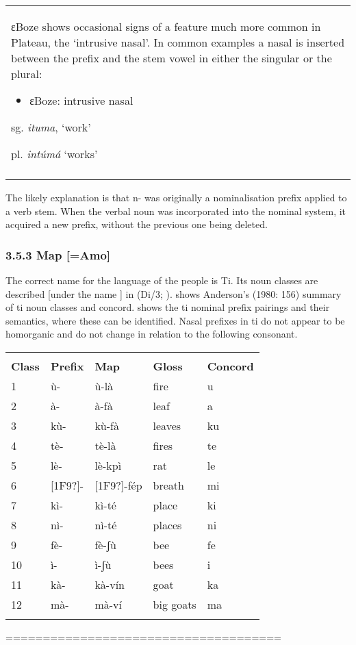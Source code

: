 \documentclass[output=paper]{langsci/langscibook}
\begin{document}
\begin{tabularx}{\textwidth}{X}
ɛBoze shows occasional signs of a feature much more common in Plateau, the ‘intrusive nasal’. In common examples a nasal is inserted between the prefix and the stem vowel in either the singular or the plural:

\begin{itemize}
\item ɛBoze: intrusive nasal\end{itemize}
    sg. \textit{ituma},  ‘work’

    pl. \textit{intúmá} ‘works’\\
\lspbottomrule
\end{tabularx}

The likely explanation is that n- was originally a nominalisation prefix applied to a verb stem. When the verbal noun was incorporated into the nominal system, it acquired a new prefix, without the previous one being deleted.

\subsubsection{3.5.3 Map [=Amo]}

The correct name for the language of the  people is Ti. Its noun classes are described [under the name ] in (Di\citealt{Luzio1972}/3; \citealt{Anderson1980}).  shows Anderson’s (1980: 156) summary of ti noun classes and concord.  shows the ti nominal prefix pairings and their semantics, where these can be identified. Nasal prefixes in ti do not appear to be homorganic and do not change in relation to the following consonant.

\begin{tabularx}{\textwidth}{XXXXX}
\lsptoprule
\multicolumn{5}{c}{{\itshape \textbf{{Table} }\textbf{{15: ti\ili{Map} nominal prefixes and concord}}}

\itshape \textbf{{===================================}}}\\
\textbf{Class} & \textbf{Prefix} & \textbf{Map} & \textbf{Gloss} & \textbf{Concord}\\
1 & ù- & ù-là & fire & u\\
2 & à- & à-fà & leaf & a\\
3 & kù- & kù-fà & leaves & ku\\
4 & tè- & tè-là & fires & te\\
5 & lè- & lè-kpì & rat & le\\
6 & [1F9?]{}- & [1F9?]{}-fép & breath & mi\\
7 & kì- & kì-té & place & ki\\
8 & nì- & nì-té & places & ni\\
9 & fè- & fè-ʃù & bee & fe\\
10 & ì- & ì-ʃù & bees & i\\
11 & kà- & kà-vín & goat & ka\\
12 & mà- & mà-ví & big goats & ma\\
\lspbottomrule
\end{tabularx}
        ===================================== 
\end{document}
